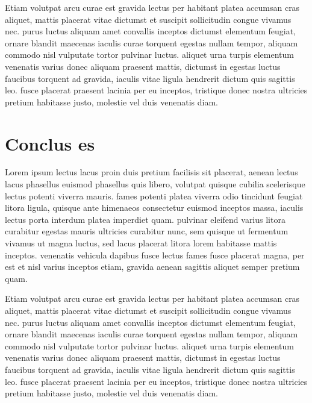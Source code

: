 \documentclass{article}
\begin{document}
Etiam volutpat arcu curae est gravida lectus per habitant platea accumsan cras aliquet, mattis placerat vitae dictumst et suscipit sollicitudin congue vivamus nec. purus luctus aliquam amet convallis inceptos dictumst elementum feugiat, ornare blandit maecenas iaculis curae torquent egestas nullam tempor, aliquam commodo nisl vulputate tortor pulvinar luctus. aliquet urna turpis elementum venenatis varius donec aliquam praesent mattis, dictumst in egestas luctus faucibus torquent ad gravida, iaculis vitae ligula hendrerit dictum quis sagittis leo. fusce placerat praesent lacinia per eu inceptos, tristique donec nostra ultricies pretium habitasse justo, molestie vel duis venenatis diam. 

\section{Conclus es}

Lorem ipsum lectus lacus proin duis pretium facilisis sit placerat, aenean lectus lacus phasellus euismod phasellus quis libero, volutpat quisque cubilia scelerisque lectus potenti viverra mauris. fames potenti platea viverra odio tincidunt feugiat litora ligula, quisque ante himenaeos consectetur euismod inceptos massa, iaculis lectus porta interdum platea imperdiet quam. pulvinar eleifend varius litora curabitur egestas mauris ultricies curabitur nunc, sem quisque ut fermentum vivamus ut magna luctus, sed lacus placerat litora lorem habitasse mattis inceptos. venenatis vehicula dapibus fusce lectus fames fusce placerat magna, per est et nisl varius inceptos etiam, gravida aenean sagittis aliquet semper pretium quam. 

Etiam volutpat arcu curae est gravida lectus per habitant platea accumsan cras aliquet, mattis placerat vitae dictumst et suscipit sollicitudin congue vivamus nec. purus luctus aliquam amet convallis inceptos dictumst elementum feugiat, ornare blandit maecenas iaculis curae torquent egestas nullam tempor, aliquam commodo nisl vulputate tortor pulvinar luctus. aliquet urna turpis elementum venenatis varius donec aliquam praesent mattis, dictumst in egestas luctus faucibus torquent ad gravida, iaculis vitae ligula hendrerit dictum quis sagittis leo. fusce placerat praesent lacinia per eu inceptos, tristique donec nostra ultricies pretium habitasse justo, molestie vel duis venenatis diam.  


\end{document}

